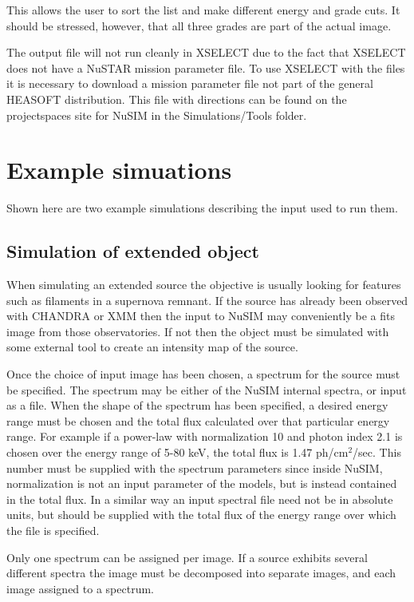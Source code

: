 This allows the user to sort the list and make different energy and grade cuts. It should be stressed, however, that all three grades are part of the actual image.

The output file will not run cleanly in XSELECT due to the fact that XSELECT does not have a NuSTAR mission parameter file. To use XSELECT with the files it is necessary to download a mission parameter file not part of the general HEASOFT distribution. This file with directions can be found on the projectspaces site for NuSIM in the Simulations/Tools folder.

\section{Example simuations}
Shown here are two example simulations describing the input used to run them.

\subsection{Simulation of extended object}
When simulating an extended source the objective is usually looking for features such as filaments in a supernova remnant. If the source has already been observed with CHANDRA or XMM then the input to NuSIM may conveniently be a fits image from those observatories. If not then the object must be simulated with some external tool to create an intensity map of the source.

Once the choice of input image has been chosen, a spectrum for the source must be specified. The spectrum may be either of the NuSIM internal spectra, or input as a file. When the shape of the spectrum has been specified, a desired energy range must be chosen and the total flux calculated over that particular energy range. For example if a power-law with normalization 10 and photon index 2.1 is chosen over the energy range of 5-80 keV, the total flux is 1.47 ph/cm$^2$/sec. This number must be supplied with the spectrum parameters since inside NuSIM, normalization is not an input parameter of the models, but is instead contained in the total flux. In a similar way an input spectral file need not be in absolute units, but should be supplied with the total flux of the energy range over which the file is specified.

Only one spectrum can be assigned per image. If a source exhibits several different spectra the image must be decomposed into separate images, and each image assigned to a spectrum.

